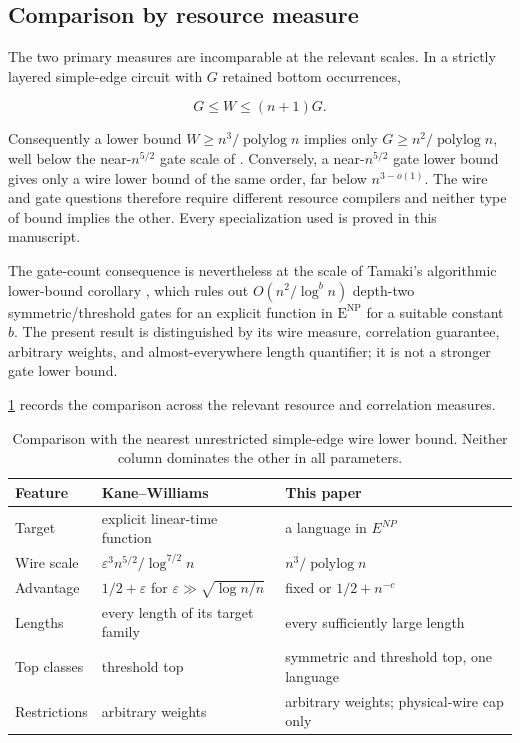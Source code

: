 \documentclass[11pt,letterpaper]{article}
\newcommand{\cref}[1]{\ref{#1}}
\let\Cref\cref
\theoremstyle{definition}
\theoremstyle{remark}
\newcommand{\Eclass}{\mathrm E^{\mathrm{NP}}}
\begin{document}
\subsection{Comparison by resource measure}\label{sec:comparison}

The two primary measures are incomparable at the relevant scales. In a
strictly layered simple-edge circuit with \(G\) retained bottom
occurrences,

\[
G\le W\le(n+1)G.
\]

Consequently a lower bound \(W\ge n^3/\operatorname{polylog}n\) implies
only \(G\ge n^2/\operatorname{polylog}n\), well below the
near-\(n^{5/2}\) gate scale of \cite{CTW26}. Conversely, a
near-\(n^{5/2}\) gate lower bound gives only a wire lower bound of the
same order, far below \(n^{3-o(1)}\). The wire and gate questions
therefore require different resource compilers and neither type of bound
implies the other. Every specialization used is proved in this manuscript.

The gate-count consequence is nevertheless at the scale of Tamaki's
algorithmic lower-bound corollary \cite{Tam16}, which rules out
\(O(n^2/\log^b n)\) depth-two symmetric/threshold gates for an explicit
function in \(\Eclass\) for a suitable constant \(b\). The present result is
distinguished by its wire measure, correlation guarantee, arbitrary weights,
and almost-everywhere length quantifier; it is not a stronger gate lower
bound.

\Cref{tab:kw-comparison} records the comparison across the relevant
resource and correlation measures.

\begin{table}[t]
\centering
\caption{Comparison with the nearest unrestricted simple-edge wire lower
bound. Neither column dominates the other in all parameters.}
\label{tab:kw-comparison}
\small
\begin{tabularx}{\textwidth}{@{}lXX@{}}
\toprule
\textbf{Feature} & \textbf{Kane--Williams \cite{KW16}} & \textbf{This
paper} \\
\midrule
Target & explicit linear-time function & a language in \(E^{NP}\) \\
Wire scale & \(\varepsilon^3n^{5/2}/\log^{7/2}n\) &
\(n^3/\operatorname{polylog}n\) \\
Advantage & \(1/2+\varepsilon\) for \(\varepsilon\gg\sqrt{\log n/n}\) &
fixed or \(1/2+n^{-c}\) \\
Lengths & every length of its target family & every sufficiently large
length \\
Top classes & threshold top & symmetric and threshold top, one
language \\
Restrictions & arbitrary weights & arbitrary weights; physical-wire cap
only \\
\bottomrule
\end{tabularx}
\end{table}
\end{document}

